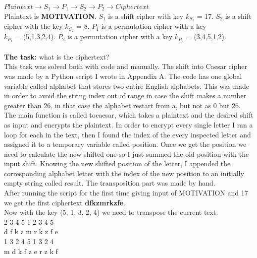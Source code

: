 \documentclass[12pt]{article}
\begin{document}
\noindent $Plaintext \rightarrow S_1 \rightarrow P_1 \rightarrow S_2 \rightarrow P_2 \rightarrow Ciphertext$
\\

\noindent Plaintext is \textbf{MOTIVATION}. $S_1$ is a shift cipher with key $k_{S_1}$ = 17.
$S_2$ is a shift cipher with the key $k_{S_2}$ = 8. $P_1$ is a permutation cipher 
with a key \\ $k_{P_1}$ = (5,1,3,2,4). $P_2$ is a permutation cipher with a key 
$k_{P_2}$ = (3,4,5,1,2). \\\\ \textbf{The task:} what is the ciphertext? \\

\noindent This task was solved both with code and manually. The shift into Caesar cipher
was made by a Python script I wrote in Appendix A. The code has one global variable
called alphabet that stores two entire English alphabets. This was made in order to
avoid the string index out of range in case the shift makes a number greater than 26, in that
case the alphabet restart from a, but not as 0 but 26. The main function is called tocaesar,
which takes a plaintext and the desired shift as input and encrypts the plaintext.
In order to encrypt every single letter I ran a loop for each in the text, then I 
found the index of the every inspected letter and assigned it to a temporary variable
called position. Once we get the position we need to calculate the new shifted one
so I just summed the old position with the input shift. Knowing the
new shifted position of the letter, I appended the corresponding 
alphabet letter with the index of
the new position to an initially empty string called result. 
The transposition part was made by hand. \\

\noindent After running the script for the first time giving input of MOTIVATION and
17 we get the first ciphertext \textbf{dfkzmrkzfe}. \\

\noindent Now with the key (5, 1, 3, 2, 4) we need to transpose the current text. \\

  2  3  4  5  1  2  3  4  5 \\
d  f  k  z  m  r  k  z  f  e \\

  1  3  2  4  5  1  3  2  4 \\
m  d  k  f  z  e  r  z  k  f \\
\end{document}
